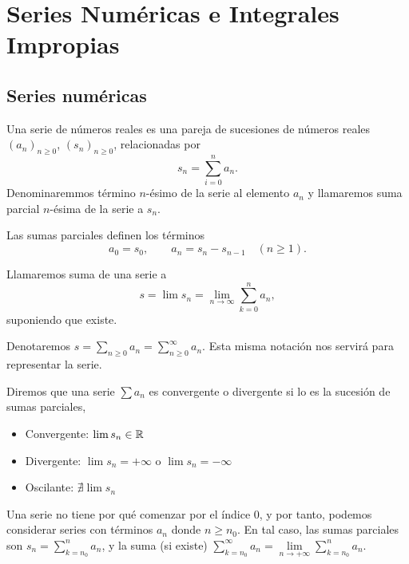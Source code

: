 \chapter{Series Numéricas e Integrales Impropias}

\section{Series numéricas}

\begin{defi}
    Una serie de números reales es una pareja de sucesiones de números reales
    $(a_n)_{n \geq 0}$, $(s_n)_{n \geq 0}$, relacionadas por
    \[
        s_n = \sum_{i=0}^{n} a_n.
    \]
    Denominaremmos término $n$-ésimo de la serie al elemento $a_n$ y llamaremos
    suma parcial $n$-ésima de la serie a $s_n$.
\end{defi}
\begin{obs*}
    Las sumas parciales definen los términos
    \[
        a_0 = s_0, \qquad a_n = s_n - s_{n-1} \quad (n \geq 1).
    \]
\end{obs*}

\begin{defi}
    Llamaremos suma de una serie a
    \[
        s = \lim s_n = \lim\limits_{n \to \infty} \sum_{k=0}^{n} a_n,
    \]
    suponiendo que existe.
\end{defi}
\begin{obs*}
    Denotaremos $s = \sum\limits_{n \geq 0} a_n = \sum\limits_{n \geq 0}^{\infty} a_n$.
    Esta misma notación nos servirá para representar la serie.
\end{obs*}

\begin{defi}
    Diremos que una serie $\sum a_n$ es convergente o divergente si lo es la
    sucesión de sumas parciales,
    \begin{itemize}
        \item Convergente: $\lim s_n \in \mathbb{R}$
        \item Divergente: $\lim s_n = + \infty$ o $\lim s_n = - \infty$
        \item Oscilante: $\nexists \lim s_n$
    \end{itemize}
\end{defi}

\begin{obs}
    Una serie no tiene por qué comenzar por el índice 0, y por tanto, podemos considerar
    series con términos $a_n$ donde $n \geq n_0$. En tal caso, las sumas parciales son
    $s_n = \sum\limits_{k=n_0}^n a_n$, y la suma (si existe) $\sum\limits_{k=n_0}^{\infty}
    a_n = \lim\limits_{n \to +\infty} \sum\limits_{k=n_0}^n a_n$.
\end{obs}


